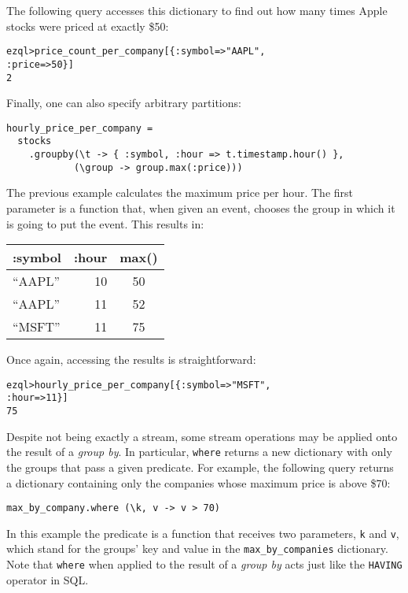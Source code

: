 \documentclass{report}
\newenvironment{evaluation}
{
  \framed
  \begin{alltt}
}
{
  \end{alltt}
  \endframed
}
\begin{document}
The following query accesses this dictionary to find out how many
times Apple stocks were priced at exactly \$50:

\begin{evaluation}
  ezql> price_count_per_company[\{ :symbol => "AAPL",
                                  :price => 50 \}]
  2
\end{evaluation}

Finally, one can also specify arbitrary partitions:

\begin{verbatim}
hourly_price_per_company =
  stocks
    .groupby(\t -> { :symbol, :hour => t.timestamp.hour() },
            (\group -> group.max(:price)))
\end{verbatim}

The previous example calculates the maximum price per hour. The first
parameter is a function that, when given an event, chooses the group
in which it is going to put the event. This results in:

\begin{tabular}{ |l|r|c| }
  \hline
  :symbol & :hour & max() \\
  \hline
  ``AAPL'' & 10 & 50 \\
  ``AAPL'' & 11 & 52 \\
  ``MSFT'' & 11 & 75 \\
  \hline
\end{tabular}

Once again, accessing the results is straightforward:

\begin{evaluation}
ezql> hourly_price_per_company[\{ :symbol => "MSFT",
                                 :hour   => 11 \}]
75
\end{evaluation}

Despite not being exactly a stream, some stream operations may be
applied onto the result of a \emph{group by}. In particular,
\verb=where= returns a new dictionary with only the groups that pass a
given predicate. For example, the following query returns a dictionary
containing only the companies whose maximum price is above \$70:

\begin{verbatim}
max_by_company.where (\k, v -> v > 70)
\end{verbatim}

In this example the predicate is a function that receives two
parameters, \verb=k= and \verb=v=, which stand for the groups' key and
value in the \verb=max_by_companies= dictionary. Note that
\verb=where= when applied to the result of a \emph{group by} acts just
like the \verb=HAVING= operator in SQL.
\end{document}
